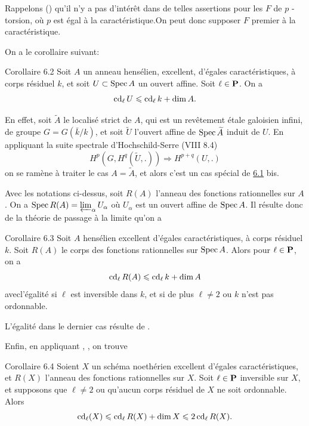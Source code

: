\documentclass[10pt]{../fichiers-configuration-latex/smfart}
\begin{document}
Rappelons () qu'il n'y a pas d'intérêt dans de telles assertions
pour les $F$ de $p$ -torsion, où $p$ est égal à la
caractéristique.\pageoriginale On peut donc supposer $F$ premier à la
caractéristique.

On a le corollaire suivant:

\begin{enonce*}{Corollaire 6.2}
Soit $A$ un anneau hensélien, excellent, d'égales caractéristiques, à
corps résiduel $k$, et soit $U\subset \operatorname{Spec} A$ un ouvert affine. Soit
$\ell \in \mathbf{P}$. On a
$$
\operatorname{cd}_{\ell}U\leqslant \operatorname{cd}_{\ell}k+\dim A{}.
$$
\end{enonce*}

En effet, soit $\widetilde{A}$ le localisé strict de $A$, qui est un
revêtement étale galoisien infini, de groupe $G=G(\bar{k}/k)$, et soit
$\widetilde{U}$ l'ouvert affine de $\operatorname{Spec} \widetilde{A}$ induit de
$U$. En appliquant la suite spectrale d'Hochschild-Serre (VIII 8.4)
$$
H^{p}(G,H^{q}(\widetilde{U},.))\Longrightarrow H^{p+q}(U,.)
$$ 
on se ramène à traiter le cas $A=\widetilde{A}$, et alors c'est un cas
spécial de \hyperref[XIX.thm6.1]{6.1} bis.

Avec les notations ci-dessus, soit $R(A)$ l'anneau des fonctions
rationnelles sur $A$. On a $\operatorname{Spec} R(A)=\varprojlim_{\alpha}U_{\alpha}$
où $U_{\alpha}$ est un ouvert affine de $\operatorname{Spec} A$. Il résulte donc de
la théorie de passage à la limite qu'on a

\begin{enonce*}{Corollaire 6.3}
Soit $A$ hensélien excellent d'égales caractéristiques, à corps
résiduel $k$. Soit $R(A)$ le corps des fonctions rationnelles sur
$\operatorname{Spec} A$. Alors pour $\ell \in \mathbf{P}$, on a
$$
\operatorname{cd}_{\ell}R(A)\leqslant \operatorname{cd}_{\ell}k+\dim A
$$
avec\pageoriginale l'égalité si $\ell$ est inversible dans $k$, et si
de plus $\ell\neq 2$ ou $k$ n'est pas ordonnable.
\end{enonce*}

L'égalité dans le dernier cas résulte de .

Enfin, en appliquant , , on trouve

\begin{enonce*}{Corollaire 6.4}
Soient $X$ un schéma noethérien excellent d'égales caractéristiques,
et $R(X)$ l'anneau des fonctions rationnelles sur $X$. Soit $\ell\in
\mathbf{P}$ inversible sur $X$, et supposons que $\ell\neq 2$ ou
qu'aucun corps résiduel de $X$ ne soit ordonnable. Alors
$$
\operatorname{cd}_{\ell}(X)\leqslant \operatorname{cd}_{\ell}R(X)+\dim X\leqslant 2\operatorname{cd}_{\ell}R(X){}.
$$
\end{enonce*}
\end{document}
